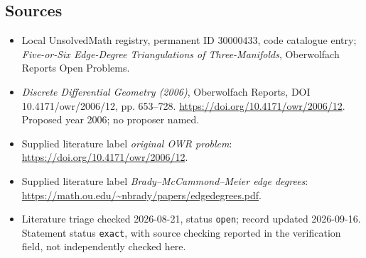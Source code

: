 \documentclass[11pt]{article}
\begin{document}
\subsection{Sources}
\begin{itemize}\item Local UnsolvedMath registry, permanent ID 30000433, code catalogue entry; \emph{Five-or-Six Edge-Degree Triangulations of Three-Manifolds}, Oberwolfach Reports Open Problems.\item \emph{Discrete Differential Geometry (2006)}, Oberwolfach Reports, DOI 10.4171/owr/2006/12, pp. 653--728. \url{https://doi.org/10.4171/owr/2006/12}. Proposed year 2006; no proposer named.\item Supplied literature label \emph{original OWR problem}: \url{https://doi.org/10.4171/owr/2006/12}.\item Supplied literature label \emph{Brady--McCammond--Meier edge degrees}: \url{https://math.ou.edu/~nbrady/papers/edgedegrees.pdf}.\item Literature triage checked 2026-08-21, status \texttt{open}; record updated 2026-09-16. Statement status \texttt{exact}, with source checking reported in the verification field, not independently checked here.\end{itemize}
\end{document}
